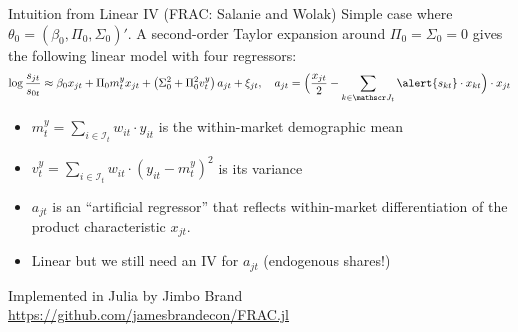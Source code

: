 \documentclass[aspectratio=169,10pt]{beamer}
\begin{document}
\begin{frame}{Intuition from Linear IV (FRAC: Salanie and Wolak)}
Simple case where $\theta_0 = (\beta_0, \Pi_0, \Sigma_0)'$. A second-order Taylor expansion around $\Pi_0 = \Sigma_0 = 0$ gives the following linear model with four regressors:
\begin{align*}
    \log\frac{s_{jt}}{s_{0t}} \approx \beta_0 x_{jt} + \Pi_0 m_t^y x_{jt} + \left(\Sigma_0^2+  \Pi_0^2 v_t^y \right) a_{jt} + \xi_{jt}, \quad a_{jt} = \Big(\frac{x_{jt}}{2} - \sum_{k \in \calJ_t} \alert{s_{kt}} \cdot x_{kt}\Big) \cdot x_{jt}
\end{align*}
\begin{itemize}
    \item $m_t^y = \sum_{i \in \mathcal{I}_t} w_{it} \cdot y_{it}$ is the within-market demographic mean
    \item $v_t^y = \sum_{i \in \mathcal{I}_t} w_{it} \cdot (y_{it} - m_t^y)^2$ is its variance
    \item $a_{jt}$ is an ``artificial regressor'' that reflects within-market differentiation of the product characteristic $x_{jt}$.\\
    \item Linear but we still need an IV for $a_{jt}$ (\alert{endogenous shares!})
\end{itemize}
Implemented in Julia by Jimbo Brand  \url{https://github.com/jamesbrandecon/FRAC.jl}
\end{frame}
\end{document}
